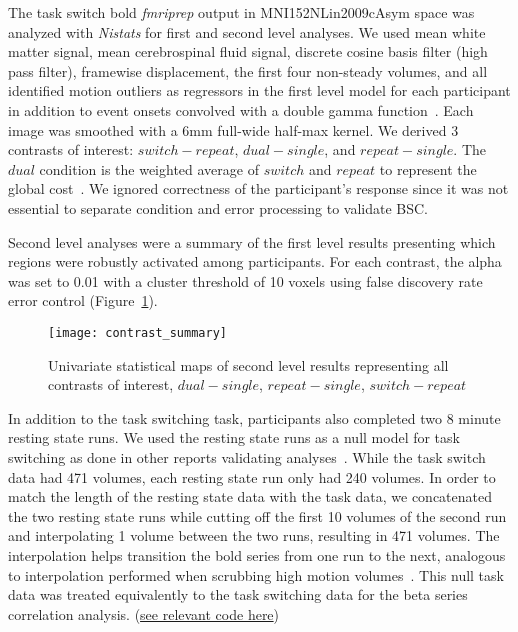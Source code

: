 \documentclass[phd,appendix,figures]{uithesis}
\begin{document}
The task switch bold \emph{fmriprep} output in MNI152NLin2009cAsym space
was analyzed with \emph{Nistats} for first and second level analyses.
We used mean white matter signal, mean cerebrospinal fluid signal,
discrete cosine basis filter (high pass filter), framewise displacement, the first four non-steady volumes, and
all identified motion outliers as regressors in the first level model for each participant
in addition to event onsets convolved with a double gamma function~\cite{Glover1999}.
Each image was smoothed with a 6mm full-wide half-max kernel.
We derived 3 contrasts of interest: $switch - repeat$, $dual- single$, and $repeat - single$.
The $dual$ condition is the weighted average of $switch$ and $repeat$ to represent the global cost~\cite{Wylie2000}.
We ignored correctness of the participant's response since it was not essential to
separate condition and error processing to validate BSC.

Second level analyses were a summary of the first level results presenting which
regions were robustly activated among participants.
For each contrast, the alpha was set to 0.01 with a cluster threshold of 10 voxels using
false discovery rate error control (Figure~\ref{fig:stat_maps}).

\begin{figure}[H]
  \centering
  \texttt{[image: contrast\_summary]}
  \caption{
    Univariate statistical maps of second level results representing
    all contrasts of interest, $dual - single$, $repeat - single$, $switch - repeat$}
  \label{fig:stat_maps}
\end{figure}

In addition to the task switching task, participants also completed
two 8 minute resting state runs.
We used the resting state runs as a null model for task switching as done
in other reports validating analyses~\cite{Eklund2016,Olszowy2019}.
While the task switch data had 471 volumes, each resting state run only had
240 volumes.
In order to match the length of the resting state data with the task data, we concatenated
the two resting state runs while cutting off the first 10 volumes of the second run
and interpolating 1 volume between the two runs, resulting in 471 volumes.
The interpolation helps transition the bold series from one run to the next,
analogous to interpolation performed when scrubbing high motion volumes~\cite{Power2014a}. 
This null task data was treated equivalently to the task switching data for the
beta series correlation analysis.
(\href{https://github.com/jdkent/validateBetaSeries/tree/195ad5b4201971038dbbf8f73a3c537caf032743}{see relevant code here})
\end{document}
